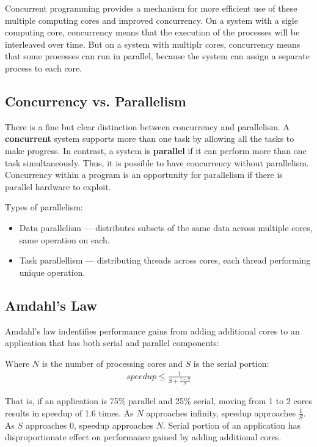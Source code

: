 \documentclass{article}
\begin{document}
Concurrent programming provides a mechanism for more efficient use of these multiple computing cores and improved concurrency.
On a system with a sigle computing core, concurrency means that the execution of the processes will be interleaved over time.
But on a system with multiplr cores, concurrency means that some processes can run in parallel, because the system can assign a separate process to each core.

\subsection{Concurrency vs. Parallelism}
There is a fine but clear distinction between concurrency and parallelism.
A \textbf{concurrent} system supports more than one task by allowing all the tasks to make progress.
In contrast, a system is \textbf{parallel} if it can perform more than one task simultaneously.
Thus, it is possible to have concurrency without parallelism.
Concurrency within a program is an opportunity for parallelism if there is parallel hardware to exploit.

Types of parallelism:
\begin{itemize}
	\item Data parallelism --- distributes subsets of the same data across multiple cores, same operation on each.
	\item Task parallellism --- distributing threads across cores, each thread performing unique operation.
\end{itemize}

\subsection{Amdahl's Law}
Amdahl's law indentifies performance gains from adding additional cores to an application that has both serial and parallel components:

\medskip
Where $N$ is the number of processing cores and $S$ is the serial portion:
\begin{align*}
	speedup \le \frac{1}{S+\frac{1-S}{N}}
\end{align*}

That is, if an application is 75\% parallel and 25\% serial, moving from 1 to 2 cores results in speedup of 1.6 times.
As $N$ approaches infinity, speedup approaches $\frac{1}{S}$.
As $S$ approaches 0, speedup approaches $N$.
Serial portion of an application has disproportionate effect on performance gained by adding additional cores.
\end{document}
